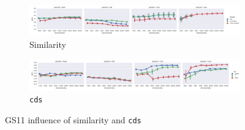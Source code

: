 \begin{figure}
  \centering

  \begin{subfigure}[t]{\textwidth}
    \includegraphics[width=1.1\textwidth]{supplement/figures/GS11-interaction-similarity}

  \caption{Similarity}
  \label{fig:gs11-similarity}
  \end{subfigure}

  \begin{subfigure}[t]{\textwidth}
    \includegraphics[width=1.1\textwidth]{supplement/figures/GS11-interaction-cds}

  \caption{\texttt{cds}}
  \label{fig:gs11-cds}
  \end{subfigure}

  \caption{GS11 influence of similarity and \texttt{cds}}
\end{figure}
